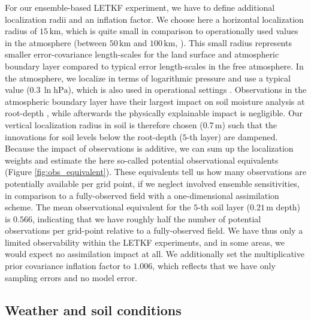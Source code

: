 \documentclass[hess, manuscript]{copernicus}
\begin{document}
For our ensemble-based LETKF experiment, we have to define additional localization radii and an inflation factor.
We choose here a horizontal localization radius of $15\,\text{km}$, which is quite small in comparison to operationally used values in the atmosphere (between $50\,\text{km}$ and $100\,\text{km}$, \citealt{schraff_kilometre-scale_2016}).
This small radius represents smaller error-covariance length-scales for the land surface and atmospheric boundary layer compared to typical error length-scales in the free atmosphere.
In the atmosphere, we localize in terms of logarithmic pressure and use a typical value ($0.3\,\ln\text{hPa}$), which is also used in operational settings \citep{schraff_kilometre-scale_2016}.
Observations in the atmospheric boundary layer have their largest impact on soil moisture analysis at root-depth \citep{munozsabater_assimilation_2019}, while afterwards the physically explainable impact is negligible.
Our vertical localization radius in soil is therefore chosen ($0.7\,\text{m}$) such that the innovations for soil levels below the root-depth ($5$-th layer) are dampened.
Because the impact of observations is additive, we can sum up the localization weights and estimate the here so-called potential observational equivalents (Figure \ref{fig:obs_equivalent}).
These equivalents tell us how many observations are potentially available per grid point, if we neglect involved ensemble sensitivities, in comparison to a fully-observed field with a one-dimensional assimilation scheme.
The mean observational equivalent for the $5$-th soil layer ($0.21\,\text{m}$ depth) is $0.566$, indicating that we have roughly half the number of potential observations per grid-point relative to a fully-observed field.
We have thus only a limited observability within the LETKF experiments, and in some areas, we would expect no assimilation impact at all.
We additionally set the multiplicative prior covariance inflation factor to $1.006$, which reflects that we have only sampling errors and no model error.

\subsection{Weather and soil conditions}
\end{document}
